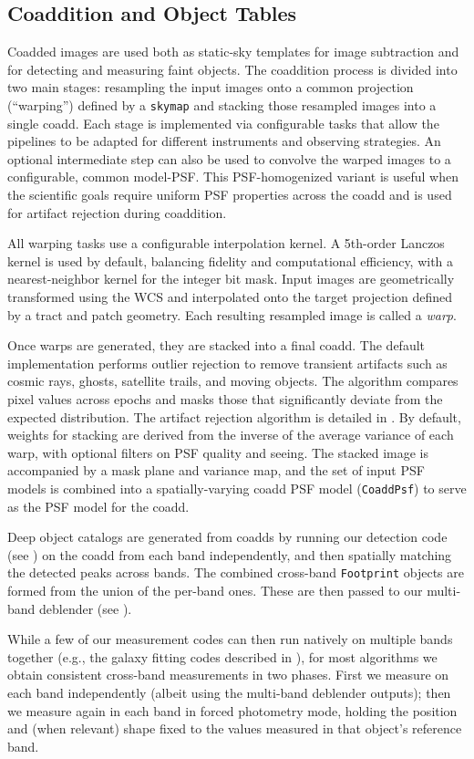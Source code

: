 \subsection{Coaddition and Object Tables}
\label{sec:coaddition-and-objects}

Coadded images are used both as static-sky templates for image subtraction and for detecting and measuring faint objects.
The coaddition process is divided into two main stages: resampling the input images onto a common projection (``warping'') defined by a \texttt{skymap}  and stacking those resampled images into a single coadd.
Each stage is implemented via configurable tasks that allow the pipelines to be adapted for different instruments and observing strategies.
An optional intermediate step can also be used to convolve the warped images to a configurable, common model-PSF.
This PSF-homogenized variant is useful when the scientific goals require uniform PSF properties across the coadd and is used for artifact rejection during coaddition.

All warping tasks use a configurable interpolation kernel.
A 5th-order Lanczos kernel is used by default, balancing fidelity and computational efficiency, with a nearest-neighbor kernel for the integer bit mask.
Input images are geometrically transformed using the WCS and interpolated onto the target projection defined by a tract and patch geometry.
Each resulting resampled image is called a \emph{warp}.

Once warps are generated, they are stacked into a final coadd.
The default implementation performs outlier rejection to remove transient artifacts such as cosmic rays, ghosts, satellite trails, and moving objects.
The algorithm compares pixel values across epochs and masks those that significantly deviate from the expected distribution.
The artifact rejection algorithm is detailed in \citet{DMTN-080}.
By default, weights for stacking are derived from the inverse of the average variance of each warp, with optional filters on PSF quality and seeing.
The stacked image is accompanied by a mask plane and variance map, and the set of input PSF models is combined into a spatially-varying coadd PSF model (\texttt{CoaddPsf}) to serve as the PSF model for the coadd.

Deep object catalogs are generated from coadds by running our detection code (see ) on the coadd from each band independently, and then spatially matching the detected peaks across bands.
The combined cross-band \texttt{Footprint} objects are formed from the union of the per-band ones.
These are then passed to our multi-band deblender (see ).

While a few of our measurement codes can then run natively on multiple bands together (e.g., the galaxy fitting codes described in ), for most algorithms we obtain consistent cross-band measurements in two phases.
First we measure on each band independently (albeit using the multi-band deblender outputs); then we measure again in each band in forced photometry mode, holding the position and (when relevant) shape fixed to the values measured in that object's reference band.
